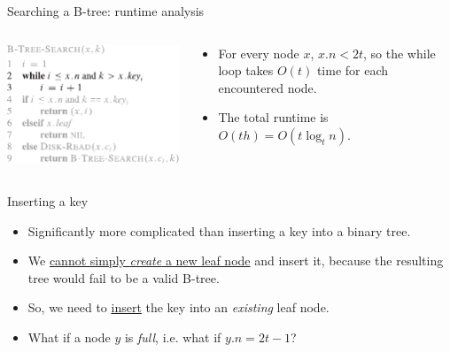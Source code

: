 \documentclass[11pt,t]{beamer}
\begin{document}
	\begin{frame}{Searching a B-tree: runtime analysis}
		\vspace{1cm}
		\begin{columns}[c]
			\begin{column}{.5\textwidth}
				\includegraphics[width=.9\columnwidth]{images/runtime}
			\end{column}
			\begin{column}{.5\textwidth}
				\begin{itemize}[<+->]
					\item For every node \(x\), \(x.n < 2t\), so the while loop takes \(O(t)\) time for each encountered node.
					\item The total runtime is \(O(th)=O(t \log_t n)\).
				\end{itemize}
			\end{column}
		\end{columns}
	\end{frame}

	\begin{frame}{Inserting a key}
		\begin{itemize}[<+->]
			\item Significantly more complicated than inserting a key into a binary tree.
			\item We \underline{cannot simply \textit{create} a new leaf node} and insert it, because the resulting tree would fail to be a valid B-tree.
			\item So, we need to \underline{insert} the key into an \textit{existing} leaf node.
			\item What if a node \(y\) is \textit{full}, i.e. what if \(y.n = 2t-1\)?
		\end{itemize}
	\end{frame}
\end{document}
